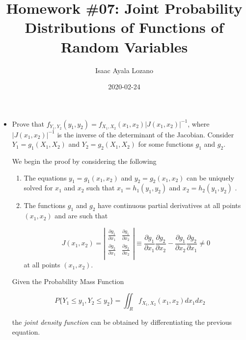 \documentclass[a4paper,12pt]{article}
\title{Homework \#07: Joint Probability Distributions of Functions of Random Variables}
\author{Isaac Ayala Lozano}
\date{2020-02-24}
\begin{document}
\maketitle
\begin{itemize}
 \item Prove that $f_{Y_1, Y_2}(y_1, y_2) = f_{X_1, X_2} (x_1, x_2) | J(x_1,x_2)| ^{-1}
 $, where $| J(x_1,x_2)| ^{-1}$ is the inverse of the determinant of the Jacobian. Consider $Y_1 = g_1(X_1, X_2)$ and $Y_2 = g_2(X_1, X_2)$ for some functions $g_1$ and $g_2$.

 We begin the proof by considering the following

 \begin{enumerate}
  \item The equations $y_1 = g_1(x_1, x_2)$ and $y_2 = g_2(x_1, x_2)$ can be uniquely solved for $x_1$ and $x_2$ such that $x_1 = h_1(y_1, y_2)$ and $x_2 = h_2(y_1, y_2)$ .
  \item The functions $g_1$ and $g_2$ have continuous partial derivatives at all points $(x_1, x_2)$ and are such that

  \begin{equation*}
   J(x_1, x_2) = \left | \begin{matrix}
                          \frac{\partial g_1}{\partial x_1} & \frac{\partial g_1}{\partial x_2}\\
                          \frac{\partial g_2}{\partial x_1} & \frac{\partial g_2}{\partial x_2}\\
                         \end{matrix}
                         \right |
                         \equiv
                          \frac{\partial g_1}{\partial x_1} \frac{\partial g_2}{\partial x_2}
                          -
                          \frac{\partial g_1}{\partial x_2}
                          \frac{\partial g_2}{\partial x_1}
                          \neq 0
  \end{equation*}
at all points $(x_1, x_2)$.
 \end{enumerate}


 Given the Probability Mass Function

 \begin{equation*}
  P\{Y_1 \leq y_1, Y_2 \leq y_2 \} = \iint_R f_{X_1, X_2} (x_1, x_2)dx_1 dx_2
 \end{equation*}

 the \emph{joint density function} can be obtained by differentiating the previous equation.


\end{itemize}
\end{document}
